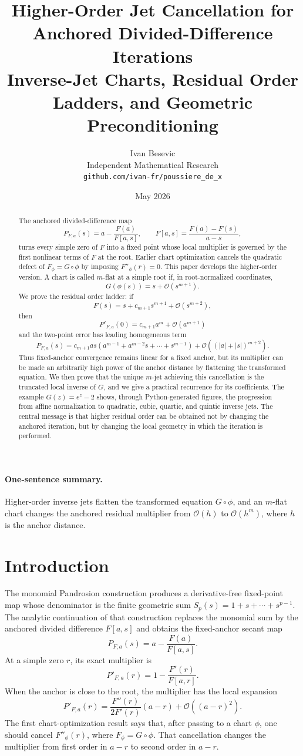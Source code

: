 \documentclass[11pt]{article}
\title{Higher-Order Jet Cancellation for Anchored Divided-Difference Iterations\\
\large Inverse-Jet Charts, Residual Order Ladders, and Geometric Preconditioning}
\author{Ivan Besevic\\Independent Mathematical Research\\\texttt{github.com/ivan-fr/poussiere\_de\_x}}
\date{May 2026}
\theoremstyle{definition}
\newcommand{\Oterm}{\mathcal{O}}
\begin{document}
\maketitle

\begin{abstract}
The anchored divided-difference map
\[
P_{F,a}(s)=a-\frac{F(a)}{F[a,s]},
\qquad
F[a,s]=\frac{F(a)-F(s)}{a-s},
\]
turns every simple zero of $F$ into a fixed point whose local multiplier is governed by the first nonlinear terms of $F$ at the root. Earlier chart optimization cancels the quadratic defect of $F_{\phi}=G\circ\phi$ by imposing $F''_{\phi}(r)=0$. This paper develops the higher-order version. A chart is called $m$-flat at a simple root if, in root-normalized coordinates,
\[
G(\phi(s))=s+\Oterm(s^{m+1}).
\]
We prove the residual order ladder: if
\[
F(s)=s+c_{m+1}s^{m+1}+\Oterm(s^{m+2}),
\]
then
\[
P'_{F,a}(0)=c_{m+1}a^m+\Oterm(a^{m+1})
\]
and the two-point error has leading homogeneous term
\[
P_{F,a}(s)=c_{m+1}as(a^{m-1}+a^{m-2}s+\cdots+s^{m-1})+
\Oterm((|a|+|s|)^{m+2}).
\]
Thus fixed-anchor convergence remains linear for a fixed anchor, but its multiplier can be made an arbitrarily high power of the anchor distance by flattening the transformed equation. We then prove that the unique $m$-jet achieving this cancellation is the truncated local inverse of $G$, and we give a practical recurrence for its coefficients. The example $G(z)=e^z-2$ shows, through Python-generated figures, the progression from affine normalization to quadratic, cubic, quartic, and quintic inverse jets. The central message is that higher residual order can be obtained not by changing the anchored iteration, but by changing the local geometry in which the iteration is performed.
\end{abstract}

\paragraph{One-sentence summary.}
Higher-order inverse jets flatten the transformed equation $G\circ\phi$, and an $m$-flat chart changes the anchored residual multiplier from $\Oterm(h)$ to $\Oterm(h^m)$, where $h$ is the anchor distance.

\section{Introduction}
The monomial Pandrosion construction produces a derivative-free fixed-point map whose denominator is the finite geometric sum $S_p(s)=1+s+\cdots+s^{p-1}$. The analytic continuation of that construction replaces the monomial sum by the anchored divided difference $F[a,s]$ and obtains the fixed-anchor secant map
\[
P_{F,a}(s)=a-\frac{F(a)}{F[a,s]}.
\]
At a simple zero $r$, its exact multiplier is
\[
P'_{F,a}(r)=1-\frac{F'(r)}{F[a,r]}.
\]
When the anchor is close to the root, the multiplier has the local expansion
\[
P'_{F,a}(r)=\frac{F''(r)}{2F'(r)}(a-r)+\Oterm((a-r)^2).
\]
The first chart-optimization result says that, after passing to a chart $\phi$, one should cancel $F''_{\phi}(r)$, where $F_{\phi}=G\circ\phi$. That cancellation changes the multiplier from first order in $a-r$ to second order in $a-r$.
\end{document}
